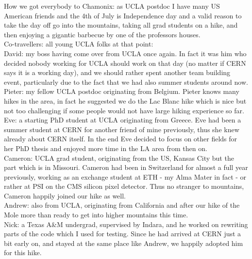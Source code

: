 How we got everybody to Chamonix: as UCLA postdoc I have many US American friends and the 4th of July is Independence day and a valid reason to take the day off go into the mountains, taking all grad students on a hike, and then enjoying a gigantic barbecue by one of the professors houses. \\

Co-travellers: all young UCLA folks at that point:\\
David: my boss having come over from UCLA once again. In fact it was him who decided nobody working for UCLA should work on that day (no matter if CERN says it is a working day), and we should rather spent another team building event, particularly due to the fact that we had also summer students around now.\\
Pieter: my fellow UCLA postdoc originating from Belgium. Pieter knows many hikes in the area, in fact he suggested we do the Lac Blanc hike which is nice but not too challenging if some people would not have large hiking experience so far.\\
Eve: a starting PhD student at UCLA originating from Greece. Eve had been a summer student at CERN for another friend of mine previously, thus she knew already about CERN itself. In the end Eve decided to focus on other fields for her PhD thesis and enjoyed more time in the LA area from then on.\\
Cameron: UCLA grad student, originating from the US, Kansas City but the part which is in Missouri. Cameron had been in Switzerland for almost a full year previously, working as an exchange student at ETH - my Alma Mater in fact -  or rather at PSI on the CMS silicon pixel detector. Thus no stranger to mountains, Cameron happily joined our hike as well.\\
Andrew: also from UCLA, originating from California and after our hike of the Mole more than ready to get into higher mountains this time.\\
Nick: a Texas A\&M undergrad, supervised by Indara, and he worked on rewriting parts of the code which I used for testing. Since he had arrived at CERN just a bit early on, and stayed at the same place like Andrew, we happily adopted him for this hike.\\

